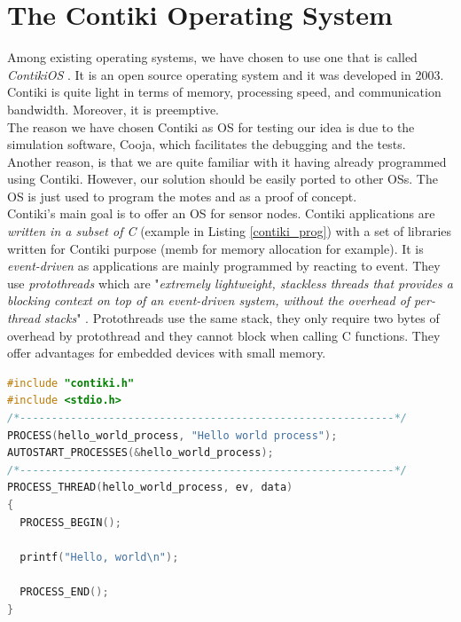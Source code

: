 \section{The Contiki Operating System}

Among existing operating systems, we have chosen to use one that is called \textit{ContikiOS} \cite{website:contiki}. It is an open source operating system and it was developed in 2003. Contiki is quite light in terms of memory, processing speed, and communication bandwidth. Moreover, it is preemptive.\\

The reason we have chosen Contiki as OS for testing our idea is due to the simulation software, Cooja, which facilitates the debugging and the tests. Another reason, is that we are quite familiar with it having already programmed using Contiki. However, our solution should be easily ported to other OSs. The OS is just used to program the motes and as a proof of concept.\\

Contiki's main goal is to offer an OS for sensor nodes. Contiki applications are \textit{written in a subset of C} (example in Listing \ref{contiki_prog}) with a set of libraries written for Contiki purpose (memb for memory allocation for example). It is \textit{event-driven} as applications are mainly programmed by reacting to event. They use \textit{protothreads} which are "\textit{extremely lightweight, stackless threads that provides a blocking context on top of an event-driven system, without the overhead of per-thread stacks}" \cite{website:protothread}. Protothreads use the same stack, they only require two bytes of overhead by protothread and they cannot block when calling C functions. They offer advantages for embedded devices with small memory. \\

\begin{lstlisting}[language=C, frame=single, caption={Hello world program}, label=contiki_prog]
#include "contiki.h"
#include <stdio.h>
/*-----------------------------------------------------------*/
PROCESS(hello_world_process, "Hello world process");
AUTOSTART_PROCESSES(&hello_world_process);
/*-----------------------------------------------------------*/
PROCESS_THREAD(hello_world_process, ev, data)
{
  PROCESS_BEGIN();

  printf("Hello, world\n");

  PROCESS_END();
}
\end{lstlisting}

